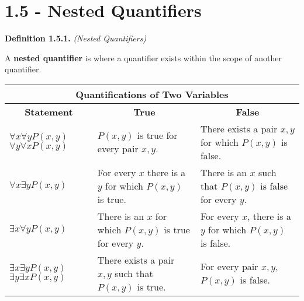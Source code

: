 \documentclass[12pt, letterpaper]{article}
\begin{document}

\pagebreak

\section{1.5 - Nested Quantifiers}

\textbf{Definition 1.5.1.} \textit{(Nested Quantifiers)}
\medskip

A \textbf{nested quantifier} is where a quantifier exists within the scope of another quantifier.

\medskip
\begin{center}
\begin{tabular}{|lllll|}
\hline
\multicolumn{5}{|c|}{\textbf{Quantifications of Two Variables}}                                                                          \\ \hline
\multicolumn{1}{|c|}{\textbf{Statement}} & \multicolumn{2}{c|}{\textbf{True}} & \multicolumn{2}{c|}{\textbf{False}} \\ \hline
    \multicolumn{1}{|p{3em}|}{$ \forall x \forall y P(x, y) $ $ \forall y \forall x P(x, y) $ }                   & \multicolumn{2}{p{5cm}|}{ $ P(x, y) $ is true for every pair $ x, y $. }              & \multicolumn{2}{p{5cm}|}{There exists a pair $ x, y $ for which $ P(x, y) $ is false. }               \\ \hline
    \multicolumn{1}{|p{3em}|}{$ \forall x \exists y P(x, y) $}                   & \multicolumn{2}{p{5cm}|}{For every $ x $ there is a $ y $ for which $ P(x, y) $ is true. }              & \multicolumn{2}{p{5cm}|}{There is an $ x $ such that $ P(x, y) $ is false for every $ y $. }               \\ \hline
    \multicolumn{1}{|p{3em}|}{$ \exists x \forall y P(x, y) $}                   & \multicolumn{2}{p{5cm}|}{There is an $ x $ for which $ P(x, y) $ is true for every $ y $. }              & \multicolumn{2}{p{5cm}|}{For every $ x $, there is a $ y $ for which $ P(x, y) $ is false. }               \\ \hline
    \multicolumn{1}{|p{3em}|}{$ \exists x \exists y P(x, y) $ $ \exists y \exists x P(x, y) $ }                   & \multicolumn{2}{p{5cm}|}{There exists a pair $ x, y $ such that $ P(x, y) $ is true. }              & \multicolumn{2}{p{5cm}|}{For every pair $ x, y $, $ P(x, y) $ is false. }               \\ \hline
\end{tabular}
\end{center}
\medskip
\end{document}
